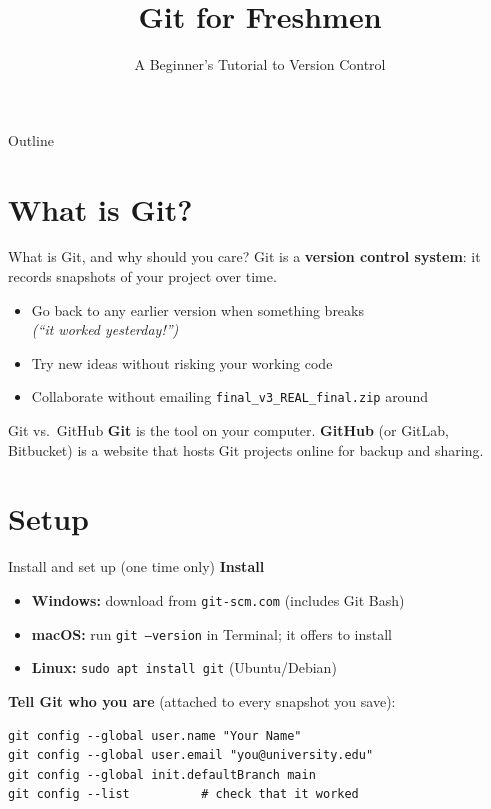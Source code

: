 \documentclass[aspectratio=169,11pt]{beamer}
\title{Git for Freshmen}
\subtitle{A Beginner's Tutorial to Version Control}
\author{}
\date{}
\newcommand{\cmd}[1]{\texttt{\color{gitred}#1}}
\begin{document}
\begin{frame}
  \titlepage
\end{frame}

\begin{frame}{Outline}
  \tableofcontents
\end{frame}

\section{What is Git?}

\begin{frame}{What is Git, and why should you care?}
  Git is a \textbf{version control system}: it records snapshots of your project over time.

  \vspace{0.5em}
  \begin{itemize}
    \item Go back to any earlier version when something breaks
          \\ \textit{(``it worked yesterday!'')}
    \item Try new ideas without risking your working code
    \item Collaborate without emailing \texttt{final\_v3\_REAL\_final.zip} around
  \end{itemize}

  \vspace{0.5em}
  \begin{block}{Git vs.\ GitHub}
    \textbf{Git} is the tool on your computer.
    \textbf{GitHub} (or GitLab, Bitbucket) is a website that hosts Git projects online
    for backup and sharing.
  \end{block}
\end{frame}

\section{Setup}

\begin{frame}[fragile]{Install and set up (one time only)}
  \textbf{Install}
  \begin{itemize}
    \item \textbf{Windows:} download from \texttt{git-scm.com} (includes Git Bash)
    \item \textbf{macOS:} run \cmd{git --version} in Terminal; it offers to install
    \item \textbf{Linux:} \cmd{sudo apt install git} (Ubuntu/Debian)
  \end{itemize}

  \textbf{Tell Git who you are} (attached to every snapshot you save):
\begin{lstlisting}
git config --global user.name "Your Name"
git config --global user.email "you@university.edu"
git config --global init.defaultBranch main
git config --list          # check that it worked
\end{lstlisting}
\end{frame}
\end{document}
